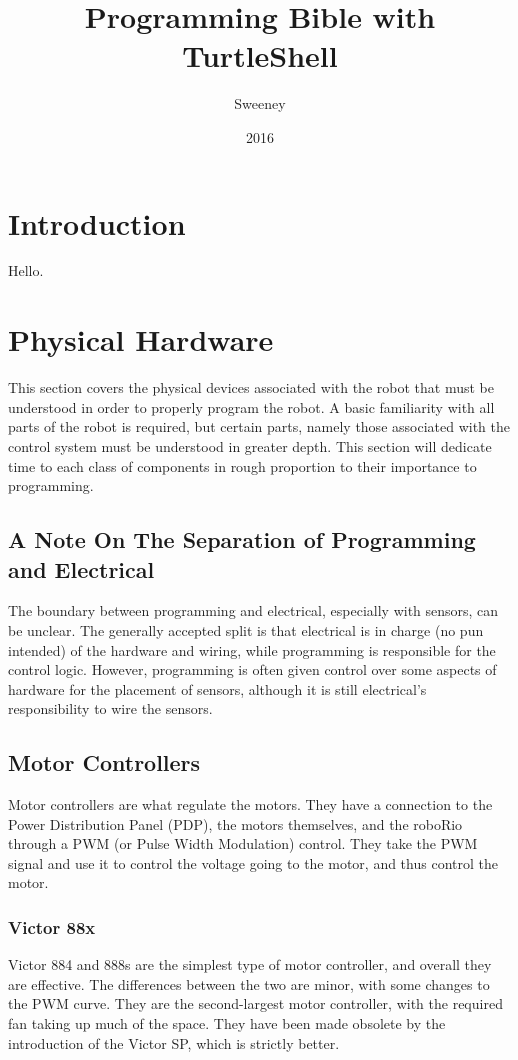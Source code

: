 \documentclass[]{report}
\title{Programming Bible with TurtleShell}
\author{Sweeney}
\date{2016}
\begin{document}
\newcommand{\ITwoC}{I$^{2}$C}
\newcommand{\trademark}{$^{TM}$}
\newcommand{\goodcopyright}{$^{\copyright}$}
\maketitle

\tableofcontents

\chapter{Introduction}
Hello.



\chapter{Physical Hardware}
	This section covers the physical devices associated with the robot that must be understood in order to properly program the robot.
	A basic familiarity with all parts of the robot is required, but certain parts, namely those associated with the control system must be understood in greater depth.
	This section will dedicate time to each class of components in rough proportion to their importance to programming.
\section{A Note On The Separation of Programming and Electrical}
	The boundary between programming and electrical, especially with sensors, can be unclear.
	The generally accepted split is that electrical is in charge (no pun intended) of the hardware and wiring, while programming is responsible for the control logic.
	However, programming is often given control over some aspects of hardware for the placement of sensors, although it is still electrical's responsibility to wire the sensors.
\section{Motor Controllers}
	Motor controllers are what regulate the motors.
	They have a connection to the Power Distribution Panel (PDP), the motors themselves, and the roboRio through a PWM (or Pulse Width Modulation) control.
	They take the PWM signal and use it to control the voltage going to the motor, and thus control the motor.
\subsection{Victor 88x}
	Victor 884 and 888s are the simplest type of motor controller, and overall they are effective.
	The differences between the two are minor, with some changes to the PWM curve.
	They are the second-largest motor controller, with the required fan taking up much of the space.
	They have been made obsolete by the introduction of the Victor SP, which is strictly better.
\end{document}
